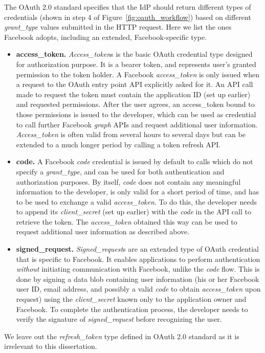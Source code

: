 The OAuth 2.0 standard specifies that the IdP should return different types of credentials (shown in step 4 of Figure~\ref{fig:oauth_workflow}) based on different \emph{grant\_type} values submitted in the HTTP request.  Here we list the ones Facebook adopts, including an extended, Facebook-specific type.

\begin{itemize}

\item \textbf{access\_token.} \emph{Access\_token}s is the basic OAuth credential type designed for authorization purpose.  It is a bearer token, and represents user's granted permission to the token holder.  A Facebook \emph{access\_token} is only issued when a request to the OAuth entry point API explicitly asked for it.  An API call made to request the token must contain the application ID (set up earlier) and requested permissions.  After the user agrees, an access\_token bound to those permissions is issued to the developer, which can be used as credential to call further Facebook \emph{graph} APIs and request additional user information.  \emph{Access\_token} is often valid from several hours to several days but can be extended to a much longer period by calling a token refresh API.

\item \textbf{code.} A Facebook \emph{code} credential is issued by default to calls which do not specify a \emph{grant\_type}, and can be used for both authentication and authorization purposes.  By itself, \emph{code} does not contain any meaningful information to the developer, is only valid for a short period of time, and has to be used to exchange a valid \emph{access\_token}.  To do this, the developer needs to append its \emph{client\_secret} (set up earlier) with the \emph{code} in the API call to retrieve the token.  The \emph{access\_token} obtained this way can be used to request additional user information as described above.

\item \textbf{signed\_request.} \emph{Signed\_request}s are an extended type of OAuth credential that is specific to Facebook.  It enables applications to perform authentication \emph{without} initiating communication with Facebook, unlike the \emph{code} flow.  This is done by signing a data blob containing user information (his or her Facebook user ID, email address, and possibly a valid \emph{code} to obtain \emph{access\_token} upon request) using the \emph{client\_secret} known only to the application owner and Facebook.  To complete the authentication process, the developer needs to verify the signature of \emph{signed\_request} before recognizing the user.

\end{itemize}

We leave out the \emph{refresh\_token} type defined in OAuth 2.0 standard as it is irrelevant to this dissertation.